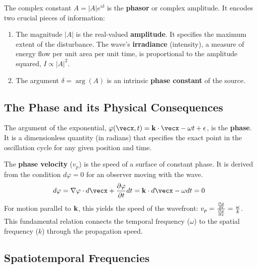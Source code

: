 \begin{proposition}
The complex constant $A = |A|e^{i\delta}$ is the \textbf{phasor} or complex amplitude. It encodes two crucial pieces of information:
\begin{enumerate}
    \item The magnitude $|A|$ is the real-valued \textbf{amplitude}. It specifies the maximum extent of the disturbance. The wave's \textbf{irradiance} (intensity), a measure of energy flow per unit area per unit time, is proportional to the amplitude squared, $I \propto |A|^2$.
    \item The argument $\delta = \arg(A)$ is an intrinsic \textbf{phase constant} of the source.
\end{enumerate}
\end{proposition}

\subsection{The Phase and its Physical Consequences}

\begin{definition}
The argument of the exponential, $\varphi(\vecx, t) = \vecbf{k} \cdot \vecx - \omega t + \epsilon$, is the \textbf{phase}. It is a dimensionless quantity (in radians) that specifies the exact point in the oscillation cycle for any given position and time.
\end{definition}

\begin{proposition}
The \textbf{phase velocity} ($v_p$) is the speed of a surface of constant phase. It is derived from the condition $d\varphi = 0$ for an observer moving with the wave.
$$ d\varphi = \nabla\varphi \cdot d\vecx + \frac{\partial\varphi}{\partial t} dt = \vecbf{k} \cdot d\vecx - \omega dt = 0 $$
For motion parallel to $\mathbf{k}$, this yields the speed of the wavefront: $v_p = \frac{\frac{\partial \varphi}{\partial t}}{\frac{\partial \varphi}{\partial x}}  = \frac{\omega}{k}$. This fundamental relation connects the temporal frequency ($\omega$) to the spatial frequency ($k$) through the propagation speed.
\end{proposition}

\subsection{Spatiotemporal Frequencies}

